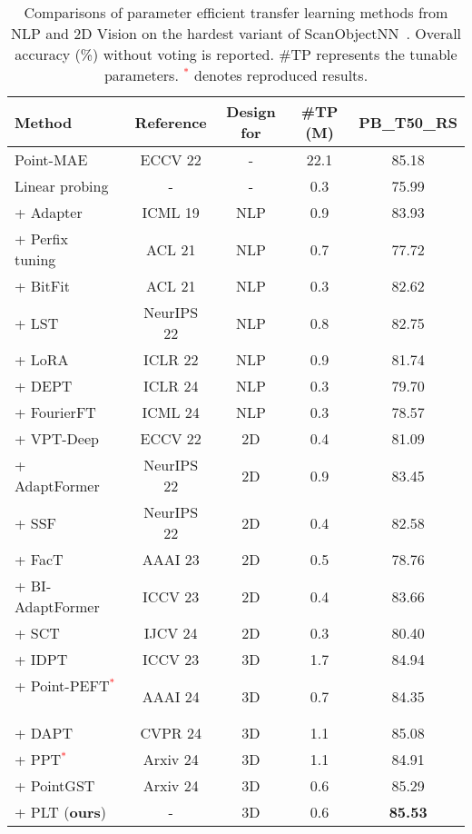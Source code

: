 \begin{table}[!t]
\scriptsize
\setlength{\tabcolsep}{1.9mm}
\centering
\caption{Comparisons of parameter efficient transfer learning methods from NLP and 2D Vision on the hardest variant of ScanObjectNN~\cite{uy2019revisiting}. Overall accuracy (\%) without voting is reported. \#TP represents the tunable parameters. \textcolor{red}{$^*$} denotes reproduced results.}
\label{tab:compare}
\begin{tabular}{ lcccc }
\toprule
 Method &Reference& Design for &\#TP (M) & PB\_T50\_RS \\
\midrule
 Point-MAE~\cite{pang2022masked}  &ECCV 22 & - & 22.1 & 85.18  \\
 Linear probing &- & - & 0.3& 75.99\\
 \midrule
  + Adapter~\cite{houlsby2019parameter}&ICML 19 & NLP & 0.9 & 83.93 \\
  + Perfix tuning~\cite{li2021prefix}& ACL 21 & NLP &0.7 & 77.72  \\
  + BitFit~\cite{zaken2022bitfit} & ACL 21 & NLP &0.3 & 82.62    \\
  + LST~\cite{sung2022lst} & NeurIPS 22 & NLP & 0.8 & 82.75\\
  + LoRA~\cite{hu2021lora} & ICLR 22 & NLP & 0.9&  81.74   \\
  + DEPT~\cite{shi2024dept} & ICLR 24 & NLP & 0.3 & 79.70\\
  + FourierFT~\cite{Gao2024Fourier} & ICML 24 & NLP &0.3 & 78.57\\
  \midrule
  + VPT-Deep~\cite{jia2022visual}&ECCV 22 & 2D &0.4 &  81.09 \\
  + AdaptFormer~\cite{chen2022adaptformer} &NeurIPS 22 & 2D &0.9  & 83.45 \\
  + SSF~\cite{lian2022scaling} & NeurIPS 22 & 2D &0.4  & 82.58\\
  + FacT~\cite{jie2023fact} & AAAI 23 & 2D & 0.5 & 78.76\\
  + BI-AdaptFormer~\cite{jie2023revisiting} & ICCV 23 & 2D & 0.4 & 83.66\\
  + SCT~\cite{zhao2024sct} & IJCV 24 & 2D & 0.3 & 80.40\\
  \midrule
  + IDPT~\cite{zha2023instance} &ICCV 23 & 3D & 1.7 &84.94\\
  + Point-PEFT\textcolor{red}{$^*$}~\cite{tang2024point} & AAAI 24 & 3D & 0.7 &84.35\\
  + DAPT~\cite{zhou2024dynamic} & CVPR 24 & 3D & 1.1 & 85.08 \\
  + PPT\textcolor{red}{$^*$}~\cite{zhang2024positional} & Arxiv 24 & 3D & 1.1 & 84.91\\
  + PointGST~\cite{liang2024parameter} & Arxiv 24 & 3D & 0.6 & 85.29\\
  \rowcolor{linecolor!40}+ PLT (\textbf{ours}) & - & 3D & 0.6 & \textbf{85.53} \\
\bottomrule
\end{tabular}
\end{table}
